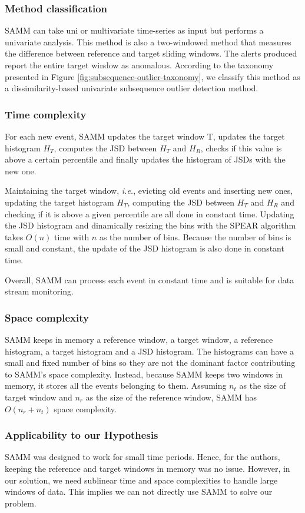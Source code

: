 \subsubsection*{Method classification}
SAMM can take uni or multivariate time-series as input but performs a univariate analysis. This method is also a two-windowed method that measures the difference between reference and target sliding windows. The alerts produced report the entire target window as anomalous. According to the taxonomy presented in Figure \ref{fig:subsequence-outlier-taxonomy}, we classify this method as a dissimilarity-based univariate subsequence outlier detection method.

\subsubsection*{Time complexity}
For each new event, SAMM updates the target window T, updates the target histogram $H_T$, computes the JSD between $H_T$ and $H_R$, checks if this value is above a certain percentile and finally updates the histogram of JSDs with the new one. 

Maintaining the target window, \textit{i.e.}, evicting old events and inserting new ones, updating the target histogram $H_T$, computing the JSD between $H_T$ and $H_R$ and checking if it is above a given percentile are all done in constant time. Updating the JSD histogram and dinamically resizing the bins with the SPEAR algorithm takes $O(n)$ time with $n$ as the number of bins. Because the number of bins is small and constant, the update of the JSD histogram is also done in constant time.

Overall, SAMM can process each event in constant time and is suitable for data stream monitoring.

\subsubsection*{Space complexity}
SAMM keeps in memory a reference window, a target window, a reference histogram, a target histogram and a JSD histogram. The histograms can have a small and fixed number of bins so they are not the dominant factor contributing to SAMM's space complexity. Instead, because SAMM keeps two windows in memory, it stores all the events belonging to them. Assuming $n_t$ as the size of target window and $n_r$ as the size of the reference window, SAMM has $O(n_r + n_t)$ space complexity.

\subsubsection*{Applicability to our Hypothesis}
SAMM was designed to work for small time periods. Hence, for the authors, keeping the reference and target windows in memory was no issue. However, in our solution, we need sublinear time and space complexities to handle large windows of data. This implies we can not directly use SAMM to solve our problem.

